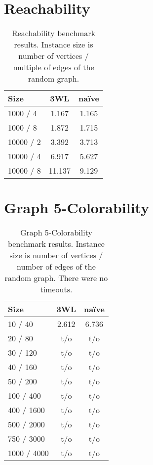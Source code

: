 \documentclass{vutinfth} %
\begin{document}
\section{Reachability}

\begin{table}
	\begin{center}
	\begin{tabular}{|l|c|c|}
\hline
Size & 3WL & na\"{i}ve \\ 
\hline
 1000 / 4 &  1.167 & 1.165\\
 1000 / 8 &  1.872 & 1.715\\
10000 / 2 &  3.392 & 3.713\\
10000 / 4 &  6.917 & 5.627\\
10000 / 8 & 11.137 & 9.129\\
\hline
	\end{tabular}
	\end{center}
	\caption{Reachability benchmark results. Instance size is number of vertices / multiple of edges of the random graph.}
\end{table}

\section{Graph 5-Colorability}

\begin{table}
\begin{center}
	\begin{tabular}{|l|c|c|}
\hline
Size & 3WL & na\"{i}ve \\
\hline
    10 / 40 & 2.612 & 6.736\\
    20 / 80 &   t/o & t/o \\
   30 / 120 &   t/o & t/o \\
   40 / 160 &   t/o & t/o \\
   50 / 200 &   t/o & t/o \\
  100 / 400 &   t/o & t/o \\
 400 / 1600 &   t/o & t/o \\
 500 / 2000 &   t/o & t/o \\
 750 / 3000 &   t/o & t/o \\
1000 / 4000 &   t/o & t/o \\
\hline
	\end{tabular}
	\end{center}
	\caption{Graph 5-Colorability benchmark results. Instance size is number of vertices / number of edges of the random graph. There were no timeouts.}
\end{table}
\end{document}
